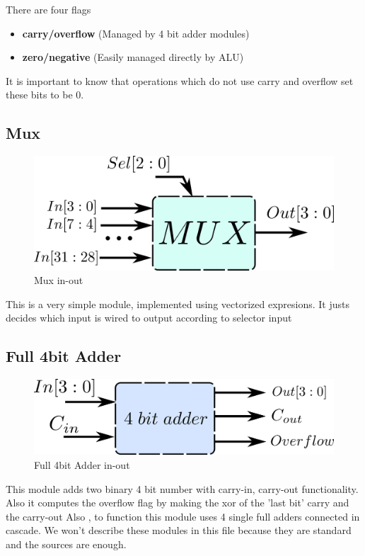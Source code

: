There are four flags
\begin{itemize}
  \item \textbf{carry/overflow} (Managed by 4 bit adder modules)
  \item \textbf{zero/negative} (Easily managed directly by ALU)
\end{itemize}
It is important to know that operations which do not use carry and overflow set these bits to be 0.

\subsection*{Mux}
\begin{figure}[H]
  \begin{centering}
  \includegraphics[scale=1]{data/mux.png}
  \par\end{centering}
  \caption{Mux in-out}
\end{figure}

This is a very simple module, implemented using vectorized expresions. It justs decides which input is wired to output according to selector input

\subsection*{Full 4bit Adder}

\begin{figure}[H]
  \begin{centering}
  \includegraphics[scale=1]{data/4bitadder.png}
  \par\end{centering}
  \caption{Full 4bit Adder in-out}
\end{figure}

This module adds two binary 4 bit number with carry-in, carry-out functionality. Also it computes the overflow flag by making the xor of the 'last bit' carry and the carry-out
Also , to function this module uses 4 single full adders connected in 	
cascade. We won't describe these modules in this file because they are standard and the sources are enough.


